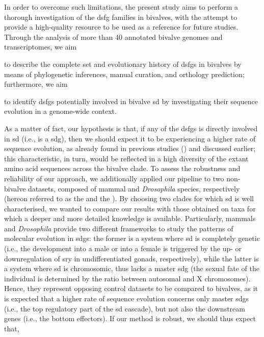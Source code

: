 In order to overcome such limitations, the present study aims to perform a thorough investigation of the \gls{dsfg} families in bivalves, with the attempt to provide a high-quality resource to be used as a reference for future studies. Through the analysis of more than 40 annotated bivalve genomes and transcriptomes, we aim
\begin{inlinelist}
	\item to describe the complete set and evolutionary history of \glspl{dsfg} in bivalves by means of phylogenetic inferences, manual curation, and orthology prediction; furthermore, we aim
	\item to identify \glspl{dsfg} potentially involved in bivalve \gls{sd} by investigating their sequence evolution in a genome-wide context.
\end{inlinelist}	
As a matter of fact, our hypothesis is that, if any of the \glspl{dsfg} is directly involved in \gls{sd} (i.e., is a \gls{sdg}), then we should expect it to be experiencing a higher rate of sequence evolution, as already found in previous studies () and discussed earlier; this characteristic, in turn, would be reflected in a high diversity of the extant amino acid sequences across the bivalve clade. To assess the robustness and reliability of our approach, we additionally applied our pipeline to two non-bivalve datasets, composed of mammal and \textit{Drosophila} species, respectively (hereon referred to as the  and the ). By choosing two clades for which \gls{sd} is well characterised, we wanted to compare our results with those obtained on taxa for which a deeper and more detailed knowledge is available. Particularly, mammals and \textit{Drosophila} provide two different frameworks to study the patterns of molecular evolution in \glspl{sdg}: the former is a system where \gls{sd} is completely genetic (i.e., the development into a male or into a female is triggered by the up- or downregulation of \gls{sry} in undifferentiated gonads, respectively), while the latter is a system where \gls{sd} is chromosomic, thus lacks a master \gls{sdg} (the sexual fate of the individual is determined by the ratio between autosomal and X chromosomes). Hence, they represent opposing control datasets to be compared to bivalves, as it is expected that a higher rate of sequence evolution concerns only master \glspl{sdg} (i.e., the top regulatory part of the \gls{sd} cascade), but not also the downstream genes (i.e., the bottom effectors). If our method is robust, we should thus expect that,
